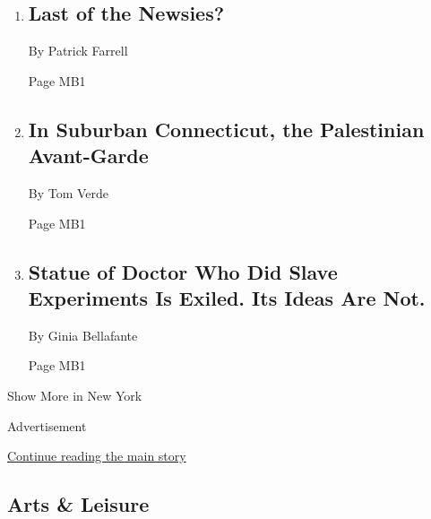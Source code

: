 \begin{enumerate}
\def\labelenumi{\arabic{enumi}.}
\item
  \href{/2018/04/20/dining/last-of-the-newsies.html}{}

  \hypertarget{last-of-the-newsies}{%
  \subsection{Last of the Newsies?}\label{last-of-the-newsies}}

  By Patrick Farrell

  Page MB1
\item
  \href{/2018/04/19/nyregion/in-suburban-connecticut-the-palestinian-avant-garde.html}{}

  \hypertarget{in-suburban-connecticut-the-palestinian-avant-garde}{%
  \subsection{In Suburban Connecticut, the Palestinian
  Avant-Garde}\label{in-suburban-connecticut-the-palestinian-avant-garde}}

  By Tom Verde

  Page MB1
\item
  \href{/2018/04/18/nyregion/sims-sculpture-green-wood-cemetery.html}{}

  \hypertarget{statue-of-doctor-who-did-slave-experiments-is-exiled-its-ideas-are-not}{%
  \subsection{Statue of Doctor Who Did Slave Experiments Is Exiled. Its
  Ideas Are
  Not.}\label{statue-of-doctor-who-did-slave-experiments-is-exiled-its-ideas-are-not}}

  By Ginia Bellafante

  Page MB1
\end{enumerate}

Show More in New York

Advertisement

\protect\hyperlink{after-mid3}{Continue reading the main story}

\hypertarget{arts--leisure}{%
\subsection{Arts \& Leisure}\label{arts--leisure}}

